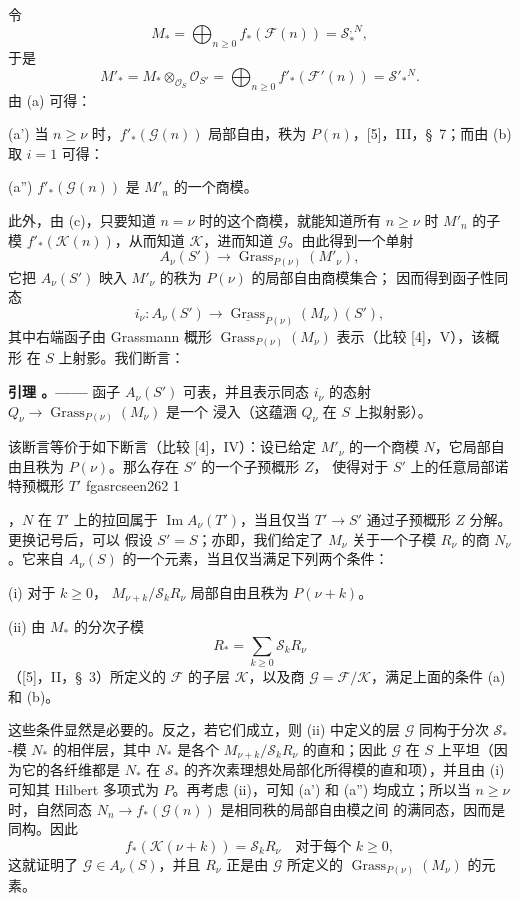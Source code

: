 \documentclass[12pt,twoside,openany]{book}
\numberwithin{equation}{section}
\newcommand{\fgaunitid}{unbound}
\newcommand{\src}[1]{%
  \phantomsection
  \hypertarget{src:\fgaunitid:#1}{}%
  \hypertarget{fga.\fgaunitid.p#1}{}%
  \ifcsname fgasrcseen#1\endcsname\else
    \expandafter\gdef\csname fgasrcseen#1\endcsname{1}%
    \hypertarget{src:#1}{}%
  \fi
  \marginpar{\raggedleft\footnotesize\sffamily #1}%
}
\theoremstyle{plain}
\theoremstyle{definition}
\theoremstyle{remark}
\newcommand{\result}[2]{%
  \par\medskip\noindent\textbf{#1%
  \if\relax\detokenize{#2}\relax\else\space#2\fi。——}\enspace
}
\begin{document}
令
\[
M_* =\bigoplus_{n\geq0}f_*(\mathcal F(n))=\mathcal S_*^{,N},
\]
于是
\[
M'_* =M_*\otimes_{\mathcal O_S}\mathcal O_{S'}
=\bigoplus_{n\geq0}f'_*(\mathcal F'(n))=\mathcal S'_*{}^{N}.
\]
由 (a) 可得：

\noindent (a') 当 $n\geq\nu$ 时，$f'_*(\mathcal G(n))$ 局部自由，秩为
$P(n)$，[5]，III，\S~7；而由 (b) 取 $i=1$ 可得：

\noindent (a'') $f'_*(\mathcal G(n))$ 是 $M'_n$ 的一个商模。

此外，由 (c)，只要知道 $n=\nu$ 时的这个商模，就能知道所有
$n\geq\nu$ 时 $M'_n$ 的子模 $f'_*(\mathcal K(n))$，从而知道
$\mathcal K$，进而知道 $\mathcal G$。由此得到一个单射
\[
A_\nu(S')\longrightarrow\operatorname{Grass}_{P(\nu)}(M'_\nu),
\]
它把 $A_\nu(S')$ 映入 $M'_\nu$ 的秩为 $P(\nu)$ 的局部自由商模集合；
因而得到函子性同态
\[
i_\nu:A_\nu(S')\longrightarrow
\underline{\operatorname{Grass}}_{P(\nu)}(M_\nu)(S'),
\]
其中右端函子由 Grassmann 概形
$\operatorname{Grass}_{P(\nu)}(M_\nu)$ 表示（比较 [4]，V），该概形
在 $S$ 上射影。我们断言：

\result{引理}{3.3} 函子 $A_\nu(S')$ 可表，并且表示同态 $i_\nu$ 的态射
$Q_\nu\longrightarrow\operatorname{Grass}_{P(\nu)}(M_\nu)$ 是一个
浸入（这蕴涵 $Q_\nu$ 在 $S$ 上拟射影）。

该断言等价于如下断言（比较 [4]，IV）：设已给定 $M'_\nu$ 的一个商模
$N$，它局部自由且秩为 $P(\nu)$。那么存在 $S'$ 的一个子预概形 $Z$，
使得对于 $S'$ 上的任意局部诺特预概形 $T'$
\src{262}
，$N$ 在 $T'$ 上的拉回属于 $\operatorname{Im}A_\nu(T')$，当且仅当
$T'\longrightarrow S'$ 通过子预概形 $Z$ 分解。更换记号后，可以
假设 $S'=S$；亦即，我们给定了 $M_\nu$ 关于一个子模 $R_\nu$ 的商
$N_\nu$。它来自 $A_\nu(S)$ 的一个元素，当且仅当满足下列两个条件：

\medskip
\noindent (i) 对于 $k\geq0$，
$M_{\nu+k}/\mathcal S_kR_\nu$ 局部自由且秩为 $P(\nu+k)$。

\smallskip
\noindent (ii) 由 $M_*$ 的分次子模
\[
R_* =\sum_{k\geq0}\mathcal S_kR_\nu
\]
（[5]，II，\S~3）所定义的 $\mathcal F$ 的子层 $\mathcal K$，以及商
$\mathcal G=\mathcal F/\mathcal K$，满足上面的条件 (a) 和 (b)。

这些条件显然是必要的。反之，若它们成立，则 (ii) 中定义的层
$\mathcal G$ 同构于分次 $\mathcal S_*$-模 $N_*$ 的相伴层，其中
$N_*$ 是各个 $M_{\nu+k}/\mathcal S_kR_\nu$ 的直和；因此
$\mathcal G$ 在 $S$ 上平坦（因为它的各纤维都是 $N_*$ 在
$\mathcal S_*$ 的齐次素理想处局部化所得模的直和项），并且由 (i)
可知其 Hilbert 多项式为 $P$。再考虑 (ii)，可知 (a') 和 (a'')
均成立；所以当 $n\geq\nu$ 时，自然同态
$N_n\longrightarrow f_*(\mathcal G(n))$ 是相同秩的局部自由模之间
的满同态，因而是同构。因此
\[
f_*(\mathcal K(\nu+k))=\mathcal S_kR_\nu
\quad\text{对于每个 $k\geq0$},
\]
这就证明了 $\mathcal G\in A_\nu(S)$，并且 $R_\nu$ 正是由
$\mathcal G$ 所定义的
$\operatorname{Grass}_{P(\nu)}(M_\nu)$ 的元素。
\end{document}
